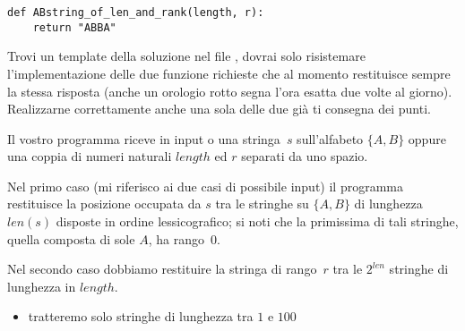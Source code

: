 \begin{verbatim}
def ABstring_of_len_and_rank(length, r):
    return "ABBA"
\end{verbatim}


Trovi un template della soluzione nel file \textbf{}, dovrai solo risistemare l'implementazione delle due funzione richieste che al momento restituisce sempre la stessa risposta (anche un orologio rotto segna l'ora esatta due volte al giorno). Realizzarne correttamente anche una sola delle due già ti consegna dei punti.


Il vostro programma riceve in input o una stringa~$s$ sull'alfabeto $\{A, B\}$
oppure una coppia di numeri naturali $length$ ed $r$ separati da uno spazio. 


Nel primo caso (mi riferisco ai due casi di possibile input) il programma restituisce la posizione occupata da $s$ tra le stringhe su $\{A,B\}$ di lunghezza $len(s)$ disposte in ordine lessicografico; si noti che la primissima di tali stringhe, quella composta di sole $A$, ha rango~$0$.

Nel secondo caso dobbiamo restituire la stringa di rango~$r$ tra le $2^{len}$ stringhe di lunghezza in $length$.



\begin{itemize}[nolistsep, noitemsep]
  \item tratteremo solo stringhe di lunghezza tra $1$ e $100$
\end{itemize}

